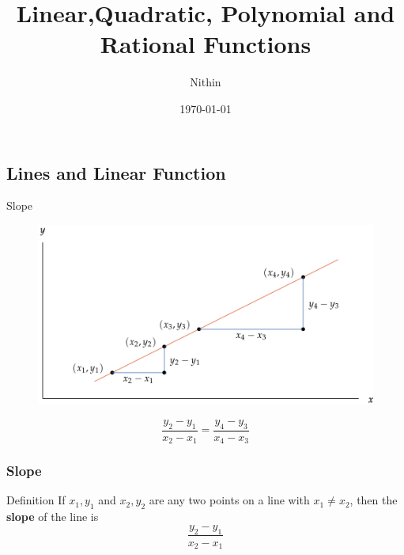 \documentclass{beamer}
\title{Linear,Quadratic, Polynomial and Rational Functions}
\author{Nithin}
\institute{}
\date{\today}
\begin{document}
\begin{frame}
  \titlepage
\end{frame}
\begin{frame}
  \tableofcontents
\end{frame}

  \subsection{Lines and Linear Function}
  \begin{frame}{Slope}
    \begin{figure}
      \centering
      \includegraphics[scale=0.25]{slope.png}
    \end{figure}

    \[\frac{y_{2} - y_{1}}{x_{2} - x_{1}} = \frac{y_{4} - y_{3}}{x_{4} - x_{3}}\]
  \end{frame}
  \begin{frame}
    \frametitle{Slope}
    \begin{block}{Definition}
      If \(x_{1},y_{1}\) and \(x_{2},y_{2}\) are any two points on a line with \(x_{1} \neq x_{2}\), then the \textbf{slope}
      of the line is 
      \[\frac{y_{2} - y_{1}}{x_{2} - x_{1}}\] 
    \end{block}
  \end{frame}
\end{document}
